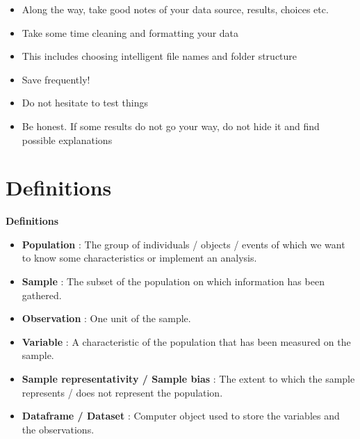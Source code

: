 \documentclass{beamer}
\begin{document}
\begin{frame}
    \begin{itemize}
        \item Along the way, take good notes of your data source, results, choices etc.
        \vspace{0.2cm}
        \item Take some time cleaning and formatting your data
        \vspace{0.2cm}
        \item This includes choosing intelligent file names and folder structure
        \vspace{0.2cm}
        \item Save frequently!
        \vspace{0.2cm}
        \item Do not hesitate to test things
        \vspace{0.2cm}
        \item Be honest. If some results do not go your way, do not hide it and find possible explanations
    \end{itemize}
\end{frame}

\section{Definitions}
\begin{frame}[plain]
    \centering \Large
    \textbf{Definitions}
\end{frame}

\begin{frame}
    \begin{itemize}
        \item \textbf{Population} : The group of individuals / objects / events of which we want to know some characteristics or implement an analysis.
        \vspace{0.2cm}
        \item \textbf{Sample} : The subset of the population on which information has been gathered.
        \vspace{0.2cm}
        \item \textbf{Observation} : One unit of the sample.
        \vspace{0.2cm}
        \item \textbf{Variable} : A characteristic of the population that has been measured on the sample. 
        \vspace{0.2cm}
        \item \textbf{Sample representativity / Sample bias} : The extent to which the sample represents / does not represent the population.
        \vspace{0.2cm}
        \item \textbf{Dataframe / Dataset} : Computer object used to store the variables and the observations.
    \end{itemize}
\end{frame}
\end{document}
